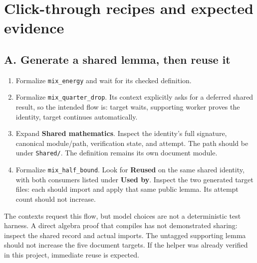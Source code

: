 \documentclass[11pt]{article}
\newcommand{\code}[1]{\texttt{#1}}
\begin{document}
\section{Click-through recipes and expected evidence}

\subsection*{A. Generate a shared lemma, then reuse it}
\begin{enumerate}
 \item Formalize \code{mix\_energy} and wait for its checked definition.
 \item Formalize \code{mix\_quarter\_drop}. Its context explicitly asks for
   a deferred shared result, so the intended flow is: target waits,
   supporting worker proves the identity, target continues automatically.
 \item Expand \textbf{Shared mathematics}. Inspect the identity's full
   signature, canonical module/path, verification state, and attempt.
   The path should be under \code{Shared/}. The definition remains its
   own document module.
 \item Formalize \code{mix\_half\_bound}. Look for \textbf{Reused} on the
   same shared identity, with both consumers listed under \textbf{Used by}.
   Inspect the two generated target files: each should import and apply
   that same public lemma. Its attempt count should not increase.
\end{enumerate}
\noindent The contexts request this flow, but model choices are not a
deterministic test harness. A direct algebra proof that compiles has not
demonstrated sharing: inspect the shared record and actual imports.
The untagged supporting lemma should not increase the five document targets.
If the helper was already verified in this project, immediate reuse is expected.
\end{document}
